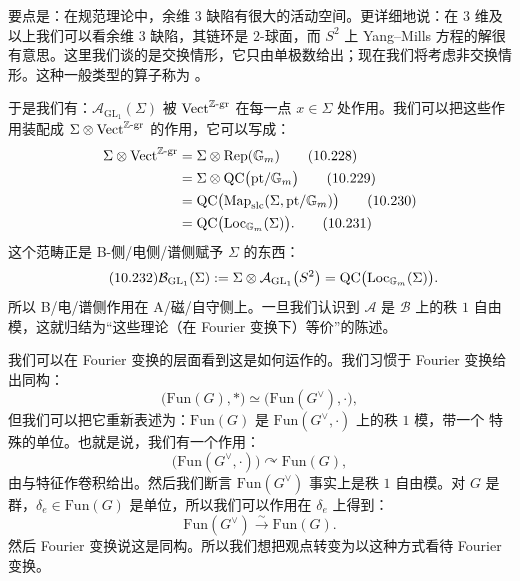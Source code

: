 要点是：在规范理论中，余维 $3$ 缺陷有很大的活动空间。更详细地说：在 $3$ 维及以上我们可以看余维 $3$ 缺陷，其链环是 $2$-球面，而 $S^2$ 上 Yang--Mills 方程的解很有意思。这里我们谈的是交换情形，它只由单极数给出；现在我们将考虑非交换情形。这种一般类型的算子称为 。

于是我们有：$\mathcal{A}_{\mathrm{GL}_1}(\Sigma)$ 被 $\mathrm{Vect}^{\mathbb{Z}\text{-gr}}$ 在每一点 $x\in\Sigma$ 处作用。我们可以把这些作用装配成 $\Sigma\otimes\mathrm{Vect}^{\mathbb{Z}\text{-gr}}$ 的作用，它可以写成：
\begin{align}
\Sigma\otimes\mathrm{Vect}^{\mathbb{Z}\text{-gr}}&=\Sigma\otimes\mathrm{Rep}(\mathbb{G}_m)\tag{10.228}\\
&=\Sigma\otimes\mathrm{QC}\big(\mathrm{pt}/\mathbb{G}_m\big)\tag{10.229}\\
&=\mathrm{QC}\big(\mathrm{Map}_{\mathrm{slc}}(\Sigma,\mathrm{pt}/\mathbb{G}_m)\big)\tag{10.230}\\
&=\mathrm{QC}\big(\mathrm{Loc}_{\mathbb{G}_m}(\Sigma)\big).\tag{10.231}
\end{align}
这个范畴正是 B-侧/电侧/谱侧赋予 $\Sigma$ 的东西：
\begin{equation}\tag{10.232}
\mathcal{B}_{\mathrm{GL}_1}(\Sigma):=\Sigma\otimes\mathcal{A}_{\mathrm{GL}_1}\big(S^2\big)=\mathrm{QC}\big(\mathrm{Loc}_{\mathbb{G}_m}(\Sigma)\big).
\end{equation}
所以 B/电/谱侧作用在 A/磁/自守侧上。一旦我们认识到 $\mathcal{A}$ 是 $\mathcal{B}$ 上的秩 $1$ 自由模，这就归结为“这些理论（在 Fourier 变换下）等价”的陈述。

我们可以在 Fourier 变换的层面看到这是如何运作的。我们习惯于 Fourier 变换给出同构：
\begin{equation}\tag{10.233}
\big(\mathrm{Fun}(G),*\big)\simeq\big(\mathrm{Fun}(G^{\vee}),\cdot\big),
\end{equation}
但我们可以把它重新表述为：$\mathrm{Fun}(G)$ 是 $\mathrm{Fun}(G^{\vee},\cdot)$ 上的秩 $1$ 模，带一个 特殊的单位。也就是说，我们有一个作用：
\begin{equation}\tag{10.234}
\big(\mathrm{Fun}(G^{\vee},\cdot)\big)\curvearrowright\mathrm{Fun}(G),
\end{equation}
由与特征作卷积给出。然后我们断言 $\mathrm{Fun}(G^{\vee})$ 事实上是秩 $1$ 自由模。对 $G$ 是群，$\delta_e\in\mathrm{Fun}(G)$ 是单位，所以我们可以作用在 $\delta_e$ 上得到：
\begin{equation}\tag{10.235}
\mathrm{Fun}(G^{\vee})\xrightarrow{\ \sim\ }\mathrm{Fun}(G).
\end{equation}
然后 Fourier 变换说这是同构。所以我们想把观点转变为以这种方式看待 Fourier 变换。

